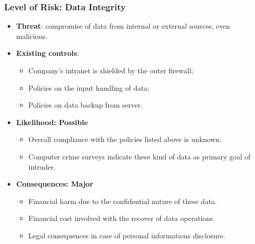 \documentclass[xcolor ={table,usenames,dvipsnames}]{beamer}
\theoremstyle{definition}
\begin{document}
	\begin{frame}
		\frametitle{Level of Risk: Data Integrity}
		\begin{itemize}
			\item \textbf{Threat}: compromise of data from internal or external sources, even malicious.
			\item \textbf{Existing controls}: 
			\begin{itemize}
				\item Company's intranet is shielded by the outer firewall;
				\item Policies on the input handling of data;
				\item Policies on data backup from server.
			\end{itemize} 
			\item \textbf{Likelihood: Possible }
			\begin{itemize}
				\item Overall compliance with the policies listed above is unknown.
				\item Computer crime surveys indicate these kind of data as primary goal of intruder. 
			\end{itemize}	
			\item \textbf{Consequences: Major}
			\begin{itemize}
				\item Financial harm due to the confidential nature of these data.
				\item Financial cost involved with the recover of data operations.
				\item Legal consequences in case of personal informations disclosure.
			\end{itemize}
		\end{itemize}
	\end{frame}
\end{document}
